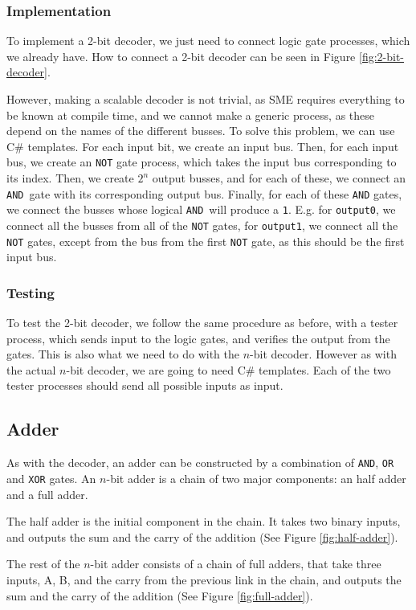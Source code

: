 \subsubsection*{Implementation}
To implement a 2-bit decoder, we just need to connect logic gate processes,
which we already have. How to connect a 2-bit decoder can be seen in Figure
\ref{fig:2-bit-decoder}.

However, making a scalable decoder is not trivial, as SME requires everything
to be known at compile time, and we cannot make a generic process, as these
depend on the names of the different busses. To solve this problem, we can use
C\# templates. For each input bit, we create an input bus. Then, for each input
bus, we create an \texttt{NOT} gate process, which takes the input bus
corresponding to its index. Then, we create $2^n$ output busses, and for each
of these, we connect an \texttt{AND} gate with its corresponding output bus.
Finally, for each of these \texttt{AND} gates, we connect the busses whose
logical \texttt{AND} will produce a \texttt{1}. E.g. for \texttt{output0}, we
connect all the busses from all of the \texttt{NOT} gates, for
\texttt{output1}, we connect all the \texttt{NOT} gates, except from the bus
from the first \texttt{NOT} gate, as this should be the first input bus.

\subsubsection*{Testing}
To test the 2-bit decoder, we follow the same procedure as before, with a
tester process, which sends input to the logic gates, and verifies the output
from the gates. This is also what we need to do with the $n$-bit decoder.
However as with the actual $n$-bit decoder, we are going to need C\# templates.
Each of the two tester processes should send all possible inputs as input.

\subsection{Adder}
As with the decoder, an adder can be constructed by a combination of
\texttt{AND}, \texttt{OR} and \texttt{XOR} gates. An $n$-bit adder is a chain
of two major components: an half adder and a full adder.

The half adder is the initial component in the chain. It takes two binary
inputs, and outputs the sum and the carry of the addition (See Figure
\ref{fig:half-adder}).

The rest of the $n$-bit adder consists of a chain of full adders, that take
three inputs, A, B, and the carry from the previous link in the chain, and
outputs the sum and the carry of the addition (See Figure
\ref{fig:full-adder}).

